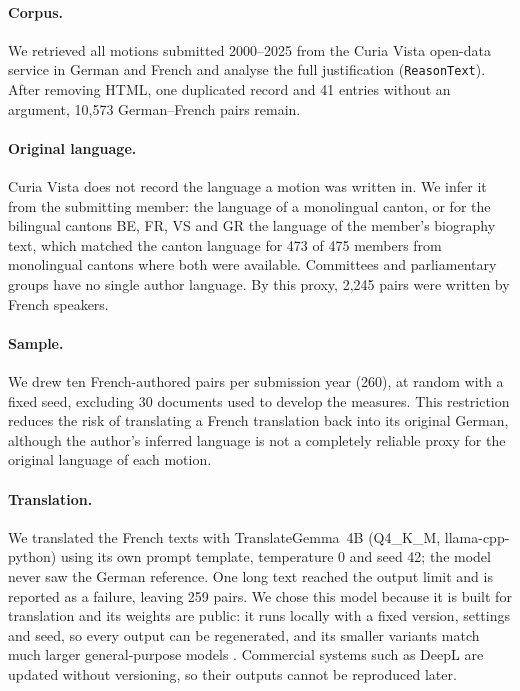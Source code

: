 \documentclass[11pt,a4paper]{article}
\begin{document}
\paragraph{Corpus.} We retrieved all motions submitted 2000--2025 from the Curia
Vista open-data service in German and French and analyse the full justification
(\texttt{ReasonText}). After removing HTML, one duplicated record and 41
entries without an argument, 10,573
German--French pairs remain.

\paragraph{Original language.} Curia Vista does not record the language a motion
was written in. We infer it from the submitting member: the language of a monolingual canton, or for the
bilingual cantons BE, FR, VS and GR the language of the member's biography text,
which matched the canton language for 473 of 475 members from monolingual
cantons where both were available. Committees and parliamentary groups have no single
author language. By this proxy, 2,245 pairs were written by French speakers.

\paragraph{Sample.} We drew ten French-authored pairs per submission year (260),
at random with a fixed seed, excluding 30 documents used to develop the
measures. This restriction reduces the risk of translating a French translation back into its original German, although the author's inferred language is not a completely reliable proxy for the original language of each motion.

\paragraph{Translation.} We translated the French texts with TranslateGemma~4B
\citep{translategemma} (Q4\_K\_M, llama-cpp-python) using its own prompt template,
temperature 0 and seed 42; the model never saw the German reference. One long text reached the output limit and is
reported as a failure, leaving 259 pairs. We chose this model because it is built
for translation and its weights are public: it runs locally with a fixed version,
settings and seed, so every output can be regenerated, and its smaller variants
match much larger general-purpose models \citep{translategemma}. Commercial
systems such as DeepL are updated without versioning, so their outputs cannot be
reproduced later.
\end{document}
